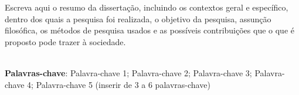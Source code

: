 \begin{thesisresumo}
Escreva aqui o resumo da disserta\c{c}\~ao, incluindo os contextos geral e espec\'ifico, dentro dos quais a pesquisa foi realizada, o objetivo da pesquisa, assun\c{c}\~ao filos\'ofica, os m\'etodos de pesquisa usados e as poss\'iveis contribui\c{c}\~oes que o que \'e proposto pode trazer \`a sociedade.

\ \\


\textbf{Palavras-chave}: Palavra-chave 1; Palavra-chave 2; Palavra-chave 3; Palavra-chave 4; Palavra-chave 5 (inserir de 3 a 6 palavras-chave)


\ \\




\end{thesisresumo}
